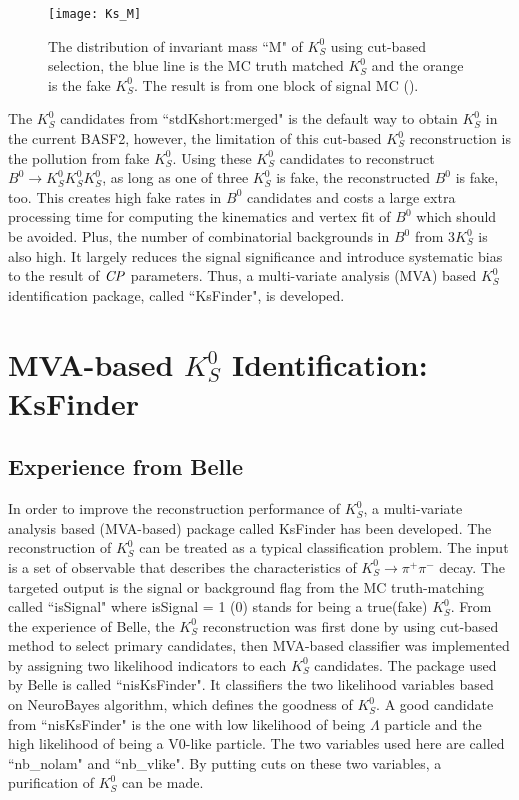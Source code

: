 \begin{figure}[htpb]
	\centering 
	\texttt{[image: Ks\_M]}
	\caption{The distribution of invariant mass ``M" of $K_S^0$ using cut-based selection, the blue line is the MC truth matched $K_S^0$ and the orange is the fake $K_S^0$. The result is from one block of signal MC ().}
	\label{fig:ksM_sigmc}
\end{figure}

The $K_S^0$ candidates from ``stdKshort:merged" is the default way to obtain $K_S^0$ in the current BASF2, 
however, the limitation of this cut-based $K_S^0$ reconstruction is the pollution from fake $K_S^0$. Using these $K_S^0$ candidates to reconstruct $B^0 \to K_S^0  K_S^0  K_S^0$, as long as one of three $K_S^0$ is fake, the reconstructed $B^0$ is fake, too. 
 This creates high fake rates in $B^0$ candidates and costs a large extra processing time for computing the kinematics and vertex fit of $B^0$ which should be avoided. Plus, the number of combinatorial backgrounds in $B^0$ from 3$K_S^0$ is also high. It largely reduces the signal significance and introduce systematic bias to the result of $\it{CP}$ parameters. Thus, a multi-variate analysis (MVA) based $K_S^0$ identification package, called ``KsFinder", is developed.


\section{MVA-based $K_S^0$ Identification: KsFinder}

\subsection{Experience from Belle}
In order to improve the reconstruction performance of $K_S^0$, a multi-variate analysis based (MVA-based) package called KsFinder has been developed. The reconstruction of $K_S^0$ can be treated as a typical classification problem. The input is a set of observable that describes the characteristics of $K_S^0 \to \pi^+ \pi^-$ decay. The targeted output is the signal or background flag from the MC truth-matching called ``isSignal" where isSignal = 1 (0) stands for being a true(fake) $K_S^0$. From the experience of Belle, the $K_S^0$ reconstruction was first done by using cut-based method to select primary candidates, then MVA-based classifier was implemented by assigning two likelihood indicators to each $K_S^0$ candidates. The package used by Belle is called ``nisKsFinder"\cite{b2book}. It classifiers the two likelihood variables based on NeuroBayes algorithm, which defines the goodness of $K_S^0$. A good candidate from ``nisKsFinder" is the one with low likelihood of being $\Lambda$ particle and the high likelihood of being a V0-like particle. The two variables used here are called ``nb\_nolam" and ``nb\_vlike". By putting cuts on these two variables, a purification of $K_S^0$ can be made. 


